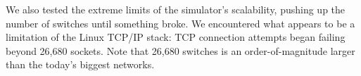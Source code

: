 {{We also tested the extreme limits of the simulator's scalability, pushing up
the number of switches until something broke. We encountered what appears to be
a limitation of the Linux TCP/IP stack: TCP connection attempts began failing
beyond 26,680 sockets. Note that 26,680 switches is an order-of-magnitude larger than
the today's biggest networks.
}

}
